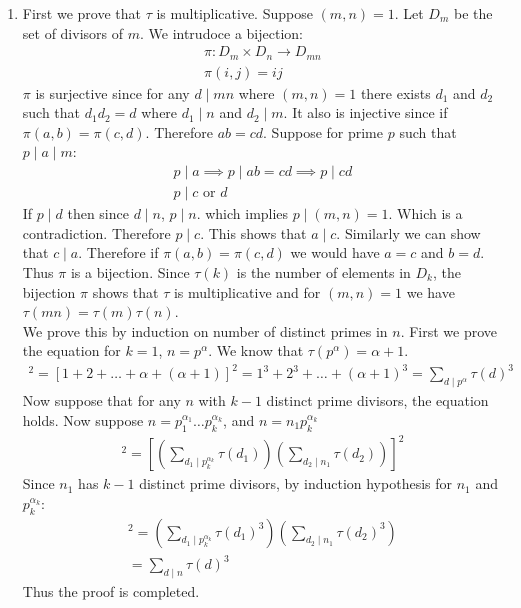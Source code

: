 \begin{enumerate}[label=]
    \item 
        First we prove that $\tau$ is multiplicative. Suppose $(m, n) = 1$. Let $D_m$ be the set of divisors of $m$. We intrudoce a bijection:
        \begin{gather*}
            \pi: D_m \times D_n \to D_{mn} \\
            \pi(i, j) = ij
        \end{gather*} 
        $\pi$ is surjective since for any $d \mid mn$ where $(m, n) = 1$ there exists $d_1$ and $d_2$ such that $d_1d_2 = d$ where $d_1 \mid n$ and $d_2 \mid m$. It also is injective since if $\pi(a, b) = \pi(c, d)$. Therefore $ab = cd$. Suppose for prime $p$ such that $p \mid a \mid m$:
        \begin{gather*}
            p \mid a \implies p \mid ab = cd \implies p \mid cd \\
            p \mid c \text{ or } d
        \end{gather*}
        If $p \mid d$ then since $d \mid n$, $p \mid n$. which implies $p \mid (m, n) = 1$. Which is a contradiction. Therefore $p \mid c$. This shows that $a \mid c$. 
        Similarly we can show that $c \mid a$. Therefore if $\pi(a, b) = \pi(c, d)$ we would have $a = c$ and $b = d$. Thus $\pi$ is a bijection. Since $\tau(k)$ is the number of elements in $D_k$, the bijection $\pi$ shows that $\tau$ is multiplicative and for $(m, n) = 1$ we have $\tau(mn) = \tau(m) \tau(n)$. \\
        We prove this by induction on number of distinct primes in $n$. 
        First we prove the equation for $k = 1$, $n = p^\alpha$. We know that $\tau(p^\alpha) = \alpha + 1$. 
        \begin{gather*}
            [\sum_{d \mid p^\alpha} \tau(d)]^2 = [1 + 2 + \dots + \alpha + (\alpha + 1)]^2 = 1^3 + 2^3 + \dots + (\alpha + 1)^3 = \sum_{d \mid p^\alpha} \tau(d)^3
        \end{gather*}
        Now suppose that for any $n$ with $k - 1$ distinct prime divisors, the equation holds. Now suppose $n = p_1^{\alpha_1} \dots p_k^{\alpha_k}$, and $n = n_1 p_k^{\alpha_k}$
        \begin{gather*}
            [\sum_{d \mid n} \tau(d)]^2 = [(\sum_{d_1 \mid p_k^{\alpha_k}} \tau(d_1))(\sum_{d_2 \mid n_1} \tau(d_2))]^2
        \end{gather*}
        Since $n_1$ has $k - 1$ distinct prime divisors, by induction hypothesis for $n_1$ and $p_k^{\alpha_k}$:
        \begin{gather*}
            [(\sum_{d_1 \mid p_k^{\alpha_k}} \tau(d_1))(\sum_{d_2 \mid n_1} \tau(d_2))]^2 = (\sum_{d_1 \mid p_k^{\alpha_k}} \tau(d_1)^3) (\sum_{d_2 \mid n_1} \tau(d_2)^3) \\
            = \sum_{d \mid n} \tau(d)^3
        \end{gather*}
        Thus the proof is completed.
\end{enumerate}